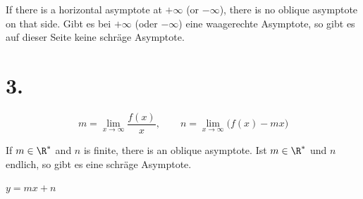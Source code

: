 \begin{important}
    {If there is a horizontal asymptote at $+\infty$ (or $-\infty$), there is no oblique asymptote on that side.}
    {Gibt es bei $+\infty$ (oder $-\infty$) eine waagerechte Asymptote, so gibt es auf dieser Seite keine schräge Asymptote.}
\end{important}

\section{3.\ }
\[
m=\lim_{x\to\infty}\frac{f(x)}{x},\qquad n=\lim_{x\to\infty}\bigl(f(x)-mx\bigr)
\]
\begin{remark}
    {If $m\in\R^*$ and $n$ is finite, there is an oblique asymptote.}
    {Ist $m\in\R^*$ und $n$ endlich, so gibt es eine schräge Asymptote.}
\end{remark}
\quad $y=mx+n$
\par{}
